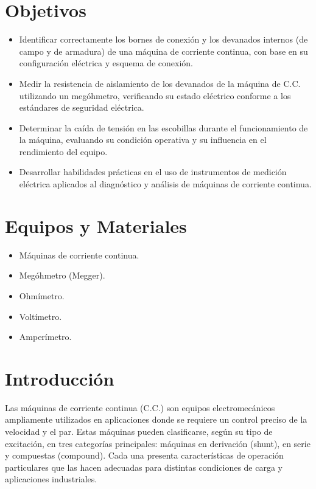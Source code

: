 \section{Objetivos}

\begin{itemize}
    \item Identificar correctamente los bornes de conexión y los devanados internos (de campo y de armadura) de una máquina de corriente continua, con base en su configuración eléctrica y esquema de conexión.
    \item Medir la resistencia de aislamiento de los devanados de la máquina de C.C. utilizando un megóhmetro, verificando su estado eléctrico conforme a los estándares de seguridad eléctrica.
    \item Determinar la caída de tensión en las escobillas durante el funcionamiento de la máquina, evaluando su condición operativa y su influencia en el rendimiento del equipo.
    \item Desarrollar habilidades prácticas en el uso de instrumentos de medición eléctrica aplicados al diagnóstico y análisis de máquinas de corriente continua.
\end{itemize}

\section{Equipos y Materiales}

\begin{itemize}
    \item Máquinas de corriente continua.
    \item Megóhmetro (Megger).
    \item Ohmímetro.
    \item Voltímetro.
    \item Amperímetro.
\end{itemize}

\section{Introducción}

Las máquinas de corriente continua (C.C.) son equipos electromecánicos ampliamente utilizados en aplicaciones donde se requiere un control preciso de la velocidad y el par. Estas máquinas pueden clasificarse, según su tipo de excitación, en tres categorías principales: máquinas en derivación (shunt), en serie y compuestas (compound). Cada una presenta características de operación particulares que las hacen adecuadas para distintas condiciones de carga y aplicaciones industriales.

